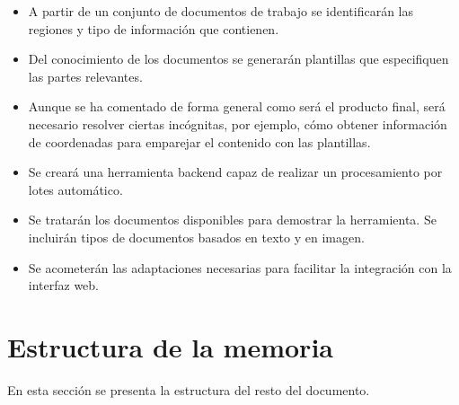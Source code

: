\begin{itemize}
    \item A partir de un conjunto de documentos de trabajo se identificarán las regiones y tipo de información que contienen.
    \item Del conocimiento de los documentos se generarán plantillas que especifiquen las partes relevantes.
    \item Aunque se ha comentado de forma general como será el producto final, será necesario resolver ciertas incógnitas, por ejemplo, cómo obtener información de coordenadas para emparejar el contenido con las plantillas.
    \item Se creará una herramienta backend capaz de realizar un procesamiento por lotes automático.
    \item Se tratarán los documentos disponibles para demostrar la herramienta. Se incluirán tipos de documentos basados en texto y en imagen.
    \item Se acometerán las adaptaciones necesarias para facilitar la integración con la interfaz web.
\end{itemize}

\section{Estructura de la memoria}

En esta sección se presenta la estructura del resto del documento.

